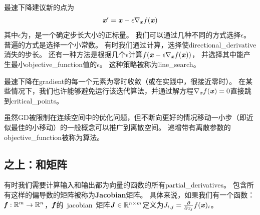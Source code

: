 最速下降建议新的点为
\begin{align}
  \boldsymbol{\mathit{x}}' = \boldsymbol{\mathit{x}} - \epsilon \nabla_{\boldsymbol{\mathit{x}}} f(\boldsymbol{\mathit{x}})
\end{align}
其中$\epsilon$为，是一个确定步长大小的正标量。
我们可以通过几种不同的方式选择$\epsilon$。
普遍的方式是选择一个小常数。
有时我们通过计算，选择使\gls{directional_derivative}消失的步长。
还有一种方法是根据几个$\epsilon$计算$f(\boldsymbol{\mathit{x}} - \epsilon \nabla_{\boldsymbol{\mathit{x}}} f(\boldsymbol{\mathit{x}}))$， 并选择其中能产生最小\gls{objective_function}值的$\epsilon$。
这种策略被称为\gls{line_search}。

最速下降在\gls{gradient}的每一个元素为零时收敛（或在实践中，很接近零时）。
在某些情况下，我们也许能够避免运行该迭代算法，并通过解方程$\nabla_{\boldsymbol{\mathit{x}}} f(\boldsymbol{\mathit{x}})= 0$直接跳到\gls{critical_points}。


虽然\gls{GD}被限制在连续空间中的优化问题，但不断向更好的情况移动一小步（即近似最佳的小移动）的一般概念可以推广到离散空间。
递增带有离散参数的\gls{objective_function}被称为算法\citep{Russel+Norvig-book2003}。

\subsection{之上：和矩阵}
\label{sec:beyond_the_gradient_jacobian_and_hessian_matrices}
有时我们需要计算输入和输出都为向量的函数的所有\gls{partial_derivatives}。
包含所有这样的偏导数的矩阵被称为\textbf{Jacobian}矩阵。
具体来说，如果我们有一个函数：$\boldsymbol{\mathit{f}}: \mathbb{R}^m \rightarrow \mathbb{R}^n$，$\boldsymbol{\mathit{f}}$的~\gls{jacobian}~矩阵$\boldsymbol{\mathit{J}} \in \mathbb{R}^{n \times m}$定义为$J_{i,j} = \frac{\partial}{\partial \mathit{x}_j} f(\boldsymbol{\mathit{x}})_i$。

